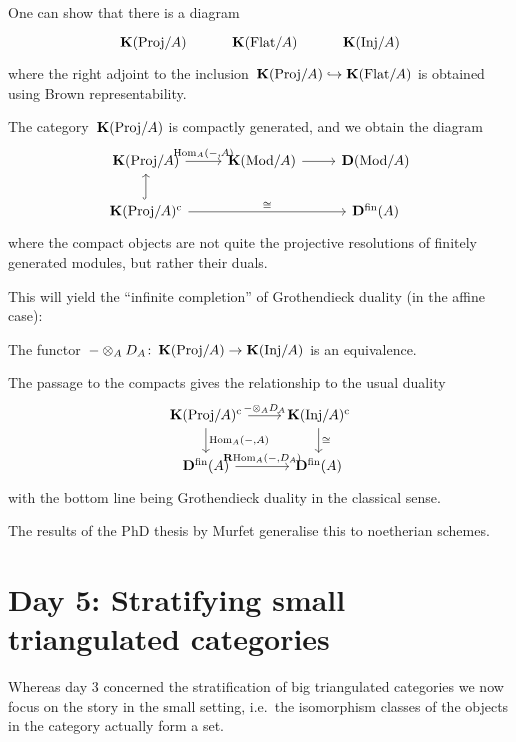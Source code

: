 \documentclass[10pt,a4paper]{article}
\begin{document}
One can show that there is a diagram %
\begin{equation}
  \begin{tikzcd}
    \KKK(\mathrm{Proj}/A) & \KKK(\Flat/A) & \KKK(\Inj/A)
  \end{tikzcd}
\end{equation}
where the right adjoint to the inclusion~$\operatorname{\mathbf{K}}(\mathrm{Proj}/A)\hookrightarrow\operatorname{\mathbf{K}}(\mathrm{Flat}/A)$ is obtained using Brown representability.
\begin{proposition}
  The category~$\operatorname{\mathbf{K}}(\mathrm{Proj}/A)$ is compactly generated, and we obtain the diagram
  \begin{equation}
    \begin{tikzcd}
      \KKK(\mathrm{Proj}/A) \arrow{r}{\Hom_A(-,A)} & \KKK(\Mod/A) \arrow{r} & \derived(\Mod/A) \\
      \KKK(\mathrm{Proj}/A)^\cc \arrow[hook]{u} \arrow{rr}{\cong} & & \derived^\fin(A)
    \end{tikzcd}
  \end{equation}
  where the compact objects are not quite the projective resolutions of finitely generated modules, but rather their duals.
\end{proposition}
This will yield the ``infinite completion'' of Grothendieck duality (in the affine case):
\begin{theorem}
  The functor~$-\otimes_AD_A\colon\operatorname{\mathbf{K}}(\mathrm{Proj}/A)\to\operatorname{\mathbf{K}}(\mathrm{Inj}/A)$ is an equivalence.
\end{theorem}
The passage to the compacts gives the relationship to the usual duality
\begin{equation}
  \begin{tikzcd}
    \KKK(\mathrm{Proj}/A)^\cc \arrow{r}{-\otimes_AD_A} \arrow{d}{\Hom_A(-,A)} & \KKK(\Inj/A)^\cc \arrow{d}{\cong} \\
    \derived^\fin(A) \arrow{r}{\RRRHom_A(-,D_A)} & \derived^\fin(A)
  \end{tikzcd}
\end{equation}
with the bottom line being Grothendieck duality in the classical sense.

\begin{remark}
  The results of the PhD thesis by Murfet generalise this to noetherian schemes.
\end{remark}

\section{Day 5: Stratifying small triangulated categories}
Whereas day 3 concerned the stratification of big triangulated categories we now focus on the story in the small setting, i.e.\ the isomorphism classes of the objects in the category actually form a set.
\end{document}
